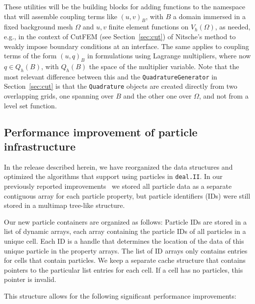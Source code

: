 \documentclass{ansarticle-preprint}
\newcommand{\specialword}[1]{\texttt{#1}}
\newcommand{\dealii}{{\specialword{deal.II}}\xspace}
\begin{document}
These utilities will be the building blocks for adding functions to the  namespace that will assemble coupling terms like $(u,v)_{B}$, with $B$ a domain immersed in a fixed background mesh $\Omega$ and $u,v$ finite element functions on $V_h(\Omega)$, as needed, e.g., in 
the context of CutFEM (see Section~\ref{sec:cut}) of Nitsche's method to weakly impose boundary conditions at an interface. The same applies to coupling terms of the form $(u,q)_B$ in formulations using Lagrange multipliers, where now $q \in Q_h(B)$, with $Q_h(B)$ the space of the multiplier variable.
Note that the most relevant difference between this and the \texttt{QuadratureGenerator} in Section~\ref{sec:cut} is that the \texttt{Quadrature} objects are created directly from two overlapping grids, one
spanning over $B$ and the other one over $\Omega$, and not from a level set function.



\subsection{Performance improvement of particle infrastructure}\label{sec:particles}

In the release described herein, we have reorganized the data
structures and optimized the algorithms that support using particles
in \dealii{}. In our previously reported improvements~\citep{dealII93} we stored all particle data as a separate contiguous array for each particle property, but particle identifiers (IDs) were still stored in a multimap tree-like structure.

Our new particle containers are organized as follows: Particle IDs are stored in a list of dynamic arrays, each array containing the particle IDs of all particles in a unique cell. Each ID is a handle that determines the location of the data of this unique particle in the property arrays.
The list of ID arrays only contains entries for cells that contain particles. We keep a separate cache structure that contains pointers to the particular list entries for each cell. If a cell has no particles, this pointer is invalid.

This structure allows for the following significant performance improvements:
\end{document}
